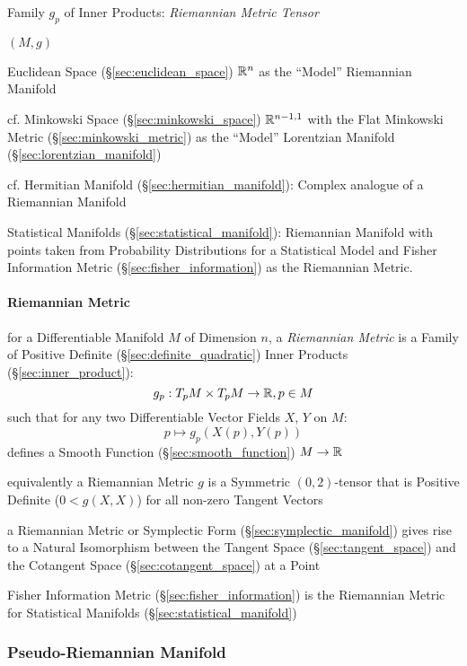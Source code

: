 Family $g_p$ of Inner Products: \emph{Riemannian Metric Tensor}

$(M,g)$

Euclidean Space (\S\ref{sec:euclidean_space}) $\mathbb{R}^n$ as the
``Model'' Riemannian Manifold

cf. Minkowski Space (\S\ref{sec:minkowski_space}) $\mathbb{R}^{n-1,1}$
with the Flat Minkowski Metric (\S\ref{sec:minkowski_metric}) as the
``Model'' Lorentzian Manifold (\S\ref{sec:lorentzian_manifold})

cf. Hermitian Manifold (\S\ref{sec:hermitian_manifold}): Complex
analogue of a Riemannian Manifold

\fist Statistical Manifolds (\S\ref{sec:statistical_manifold}):
Riemannian Manifold with points taken from Probability Distributions
for a Statistical Model and Fisher Information Metric
(\S\ref{sec:fisher_information}) as the Riemannian Metric.



\paragraph{Riemannian Metric}\label{sec:riemannian_metric}\hfill

for a Differentiable Manifold $M$ of Dimension $n$, a \emph{Riemannian
  Metric} is a Family of Positive Definite
(\S\ref{sec:definite_quadratic}) Inner Products
(\S\ref{sec:inner_product}):
\[
  g_p : T_p M \times T_p M \rightarrow \mathbb{R}, p \in M
\]
such that for any two Differentiable Vector Fields $X$, $Y$ on $M$:
\[
  p \mapsto g_p (X(p), Y(p))
\]
defines a Smooth Function (\S\ref{sec:smooth_function}) $M \rightarrow
\mathbb{R}$

equivalently a Riemannian Metric $g$ is a Symmetric $(0,2)$-tensor
that is Positive Definite ($0 < g(X,X)$) for all non-zero Tangent
Vectors %

a Riemannian Metric or Symplectic Form (\S\ref{sec:symplectic_manifold}) gives
rise to a Natural Isomorphism between the Tangent Space
(\S\ref{sec:tangent_space}) and the Cotangent Space
(\S\ref{sec:cotangent_space}) at a Point

\fist Fisher Information Metric (\S\ref{sec:fisher_information}) is
the Riemannian Metric for Statistical Manifolds
(\S\ref{sec:statistical_manifold})



\subsubsection{Pseudo-Riemannian Manifold}
\label{sec:pseudo_riemannian}


